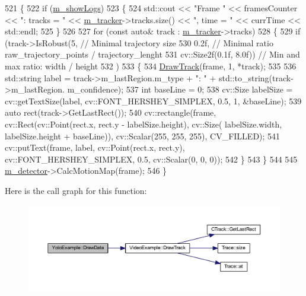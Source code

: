 \begin{DoxyCode}
521     \{
522         \textcolor{keywordflow}{if} (\mbox{\hyperlink{class_video_example_af3bfe51e3e1452bb084016602c668463}{m\_showLogs}})
523         \{
524             std::cout << \textcolor{stringliteral}{"Frame "} << framesCounter << \textcolor{stringliteral}{": tracks = "} << \mbox{\hyperlink{class_video_example_a7c58cd8c883981b2e645d1a3d8edf76a}{m\_tracker}}->tracks.size() <<
       \textcolor{stringliteral}{", time = "} << currTime << std::endl;
525         \}
526 
527         \textcolor{keywordflow}{for} (\textcolor{keyword}{const} \textcolor{keyword}{auto}& track : \mbox{\hyperlink{class_video_example_a7c58cd8c883981b2e645d1a3d8edf76a}{m\_tracker}}->tracks)
528         \{
529             \textcolor{keywordflow}{if} (track->IsRobust(5,                           \textcolor{comment}{// Minimal trajectory size}
530                                 0.2f,                        \textcolor{comment}{// Minimal ratio raw\_trajectory\_points /
       trajectory\_lenght}
531                                 cv::Size2f(0.1f, 8.0f))      \textcolor{comment}{// Min and max ratio: width / height}
532                     )
533             \{
534                 \mbox{\hyperlink{class_video_example_a84a040bc87b915c5ee18c5d11235f40c}{DrawTrack}}(frame, 1, *track);
535 
536                 std::string label = track->m\_lastRegion.m\_type + \textcolor{stringliteral}{": "} + std::to\_string(track->m\_lastRegion.
      m\_confidence);
537                 \textcolor{keywordtype}{int} baseLine = 0;
538                 cv::Size labelSize = cv::getTextSize(label, cv::FONT\_HERSHEY\_SIMPLEX, 0.5, 1, &baseLine);
539                 \textcolor{keyword}{auto} rect(track->GetLastRect());
540                 cv::rectangle(frame, cv::Rect(cv::Point(rect.x, rect.y - labelSize.height), cv::Size(
      labelSize.width, labelSize.height + baseLine)), cv::Scalar(255, 255, 255), CV\_FILLED);
541                 cv::putText(frame, label, cv::Point(rect.x, rect.y), cv::FONT\_HERSHEY\_SIMPLEX, 0.5, 
      cv::Scalar(0, 0, 0));
542             \}
543         \}
544 
545         \mbox{\hyperlink{class_video_example_a00fee4b18b68d605b87051f3bdaa1c92}{m\_detector}}->CalcMotionMap(frame);
546     \}
\end{DoxyCode}
Here is the call graph for this function\+:\nopagebreak
\begin{figure}[H]
\begin{center}
\leavevmode
\includegraphics[width=350pt]{class_yolo_example_a1e5a542fbec653a1579ac6d5ed6dea4b_cgraph}
\end{center}
\end{figure}
\mbox{\label{class_video_example_a84a040bc87b915c5ee18c5d11235f40c}} 

